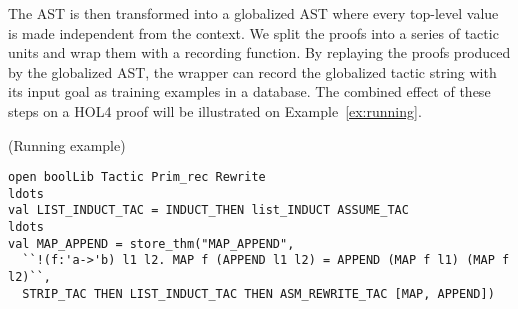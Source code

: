 \documentclass[runningheads,a4paper,draft]{svjour3}
\def\holfour{\textsf{HOL4}\xspace}
\def\sml{\textsf{SML}\xspace}
\def\polyml{\textsf{Poly/ML}\xspace}
\begin{document}
 The AST is then transformed into a globalized AST
where every top-level value is made independent from
the context.  We 
split the proofs into a series of tactic units and wrap them 
with a recording function.
By replaying the proofs produced by the globalized AST, the wrapper can
record the globalized tactic string with its input goal as training examples in
a database.
The combined effect of these steps on a \holfour proof will be illustrated on Example~\ref{ex:running}.

\begin{example}\label{ex:running}(Running example)
\small
\begin{lstlisting}[language=SMLSmall,frame=tb]
open boolLib Tactic Prim_rec Rewrite
ldots
val LIST_INDUCT_TAC = INDUCT_THEN list_INDUCT ASSUME_TAC
ldots
val MAP_APPEND = store_thm("MAP_APPEND",
  ``!(f:'a->'b) l1 l2. MAP f (APPEND l1 l2) = APPEND (MAP f l1) (MAP f l2)``,
  STRIP_TAC THEN LIST_INDUCT_TAC THEN ASM_REWRITE_TAC [MAP, APPEND])
\end{lstlisting}
\end{example} 

%
%
%
\end{document}
